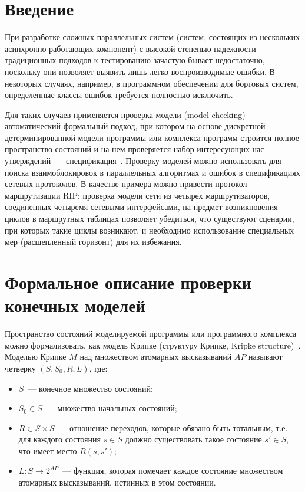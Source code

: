 \documentclass[12pt,a4paper,fleqn]{article}
\begin{document}
\section{Введение}
\label{sec:intro}

При разработке сложных параллельных систем (систем, состоящих из нескольких асинхронно работающих компонент) с высокой
степенью надежности традиционных подходов к тестированию зачастую бывает недостаточно, поскольку они позволяет выявить
лишь легко воспроизводимые ошибки. В некоторых случаях, например, в программном обеспечении для бортовых систем,
определенные классы ошибок требуется полностью исключить.

Для таких случаев применяется проверка модели (model checking)~--- автоматический формальный подход, при котором на основе
дискретной детерминированной модели программы или комплекса программ строится полное пространство состояний и на нем
проверяется набор интересующих нас утверждений~--- спецификация~\cite{Clarke}. Проверку моделей можно использовать для
поиска взаимоблокировок в параллельных алгоритмах и ошибок в спецификациях сетевых протоколов. В качестве примера можно
привести протокол маршрутизации RIP: проверка модели сети из четырех маршрутизаторов, соединенных четыремя сетевыми
интерфейсами, на предмет возникновения циклов в маршрутных таблицах позволяет убедиться, что существуют сценарии, при
которых такие циклы возникают, и необходимо использование специальных мер (расщепленный горизонт) для их
избежания.~\cite{RipOnSpin}

\section{Формальное описание проверки конечных моделей}
\label{sec:modelchecking}

Пространство состояний моделируемой программы или программного комплекса можно формализовать, как модель Крипке
(структуру Крипке, Kripke structure)~\cite{Clarke}. Моделью Крипке $M$ над множеством атомарных высказываний $AP$
называют четверку $(S, S_0, R, L)$, где:

\begin{itemize}
\item $S$~--- конечное множество состояний;
\item $S_0 \in S$~--- множество начальных состояний;
\item $R \in S \times S$~--- отношение переходов, которые обязано быть тотальным, т.е. для каждого состояния $s \in S$
  должно существовать такое состояние $s' \in S$, что имеет место $R(s, s')$;
\item $L\colon S \rightarrow 2^{AP}$~--- функция, которая помечает каждое состояние множеством  атомарных высказываний, истинных в этом состоянии.
\end{itemize}
\end{document}
